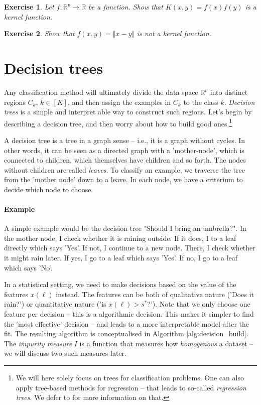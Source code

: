 \documentclass{article}
\newcommand{\R}{\mathbb{R}}
\newtheorem{exercise}{Exercise}
\newcommand{\norm}[1]{\Vert #1 \Vert}
\begin{document}
\begin{exercise}
    Let $f: \R^p\to \R$ be a function. Show that $K(x,y)=f(x)f(y)$ is a kernel function.
\end{exercise}

\begin{exercise}
    Show that $f(x,y) = \norm{x-y}$ is \emph{not} a kernel function.
\end{exercise}





\section{Decision trees}
Any classification method will ultimately divide the data space $\R^p$ into distinct regions $C_k$, $k\in[K]$, and then assign the examples in $C_k$ to the class $k$.  \emph{Decision trees} is a simple and interpret able way to construct such regions. Let's begin by describing a decision tree, and then worry about how to build good ones.\footnote{We will here solely focus on trees for classification problems. One can also apply tree-based methods for regression -- that leads to so-called \emph{regression trees}. We defer to \cite{james2023introduction} for more information on that.}

A decision tree is a tree in a graph sense -- i.e., it is a graph without cycles. In other words, it can be seen as a directed graph with a 'mother-node', which is connected to children, which themselves have children and so forth. The nodes without children are called \emph{leaves}. To classify an example, we traverse the tree from the 'mother node' down to a leave. In each node, we have a criterium to decide which node to choose.

\paragraph{Example} A simple example would be the decision tree "Should I bring an umbrella?". In the mother node, I check whether it is raining outside. If it does, I to a leaf directly which says 'Yes'. If not, I continue to a new node. There, I check whether it might rain later. If yes, I go to a leaf which says 'Yes'. If no, I go to a leaf which says 'No'. \newline

In a statistical setting, we need to make decisions based on the value of the features $x(\ell)$ instead. The features can be both of qualitative nature ('Does it rain?') or quantitative nature ('is $x(\ell)>s^*$?'). Note that we only choose one feature per decision -- this is a algorithmic decision. This makes it simpler to find the 'most effective' decision -- and leads to a more interpretable model after the fit. The resulting algorithm is conceptualised in Algorithm \ref{alg:decision_build}. The \emph{impurity measure} $I$ is a function that measures how \emph{homogenous} a dataset -- we will discuss two such measures later.
\end{document}

